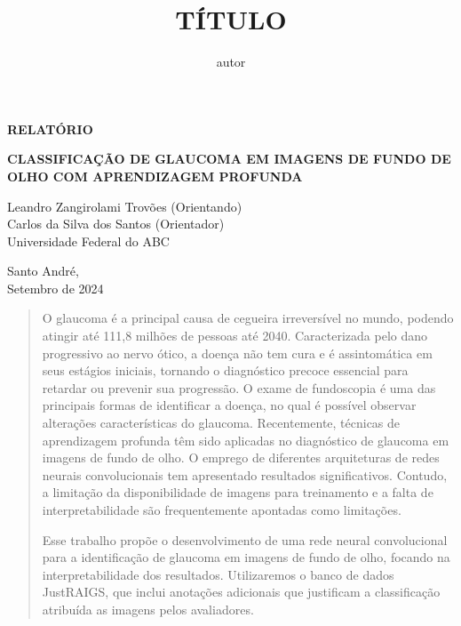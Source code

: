 \documentclass[12pt]{article}
\title{TÍTULO}
\author{autor}
\begin{document}
\thispagestyle{empty}

    
    \begin{flushright}
        \begin{huge}
            \textbf{RELATÓRIO}\\[3,5cm]
        \end{huge}
{\bf \LARGE  CLASSIFICAÇÃO DE GLAUCOMA EM IMAGENS DE FUNDO DE OLHO COM APRENDIZAGEM PROFUNDA}

\bigskip
        
        Leandro Zangirolami Trovões (Orientando)\\
        Carlos da Silva dos Santos (Orientador)\\
        Universidade Federal do ABC\\[5,5cm]
    \end{flushright}

    \vfill
    
    \begin{center}
        Santo André,\\
        Setembro de 2024
    \end{center}
    
    \newpage
\bigskip

\begin{center}
\end{center}

\begin{quote}
O glaucoma é a principal causa de cegueira irreversível no mundo, podendo atingir até 111,8 milhões de pessoas até 2040. Caracterizada pelo dano progressivo ao nervo ótico, a doença não tem cura e é assintomática em seus estágios iniciais, tornando o diagnóstico precoce essencial para retardar ou prevenir sua progressão. O exame de fundoscopia é uma das principais formas de identificar a doença, no qual é possível observar alterações características do glaucoma. Recentemente, técnicas de aprendizagem profunda têm sido aplicadas no diagnóstico de glaucoma em imagens de fundo de olho. O emprego de diferentes arquiteturas de redes neurais convolucionais tem apresentado resultados significativos. Contudo, a limitação da disponibilidade de imagens para treinamento e a falta de interpretabilidade são frequentemente apontadas como limitações.

Esse trabalho propõe o desenvolvimento de uma rede neural convolucional para a identificação de glaucoma em imagens de fundo de olho, focando na interpretabilidade dos resultados. Utilizaremos o banco de dados JustRAIGS, que inclui anotações adicionais que justificam a classificação atribuída as imagens pelos avaliadores.
\end{quote}
\end{document}
